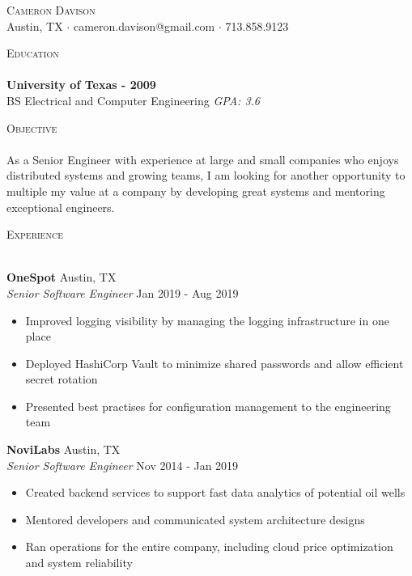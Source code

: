 \documentclass[a4paper]{article}
\newcommand{\lineunder} {
    \vspace*{-8pt} \\
    \hspace*{-18pt} \hrulefill \\
}
\newcommand{\header} [1] {
    {\hspace*{-18pt}\vspace*{6pt} \textsc{#1}}
    \vspace*{-6pt} \lineunder
}
\begin{document}
\vspace*{-40pt}

\vspace*{-10pt}
\begin{center}
	{\Huge \scshape {Cameron Davison}}\\
	Austin, TX $\cdot$ cameron.davison@gmail.com $\cdot$ 713.858.9123\\
\end{center}

\header{Education}
\textbf{University of Texas - 2009}\\
BS Electrical and Computer Engineering \textit{GPA: 3.6}\\
\vspace{2mm}

\header{Objective}
As a Senior Engineer with experience at large and small companies who enjoys distributed systems and growing teams, I
am looking for another opportunity to multiple my value at a company by developing great systems and mentoring
exceptional engineers.
\vspace{2mm}

\header{Experience}
\vspace{1mm}

\textbf{OneSpot} \hfill Austin, TX\\
\textit{Senior Software Engineer} \hfill Jan 2019 - Aug 2019\\
\vspace{-1mm}
\begin{itemize} \itemsep 1pt
\item Improved logging visibility by managing the logging infrastructure in one place
\item Deployed HashiCorp Vault to minimize shared passwords and allow efficient secret rotation
\item Presented best practises for configuration management to the engineering team
\end{itemize}

\textbf{NoviLabs} \hfill Austin, TX\\
\textit{Senior Software Engineer} \hfill Nov 2014 - Jan 2019\\
\vspace{-1mm}
\begin{itemize} \itemsep 1pt
\item Created backend services to support fast data analytics of potential oil wells
\item Mentored developers and communicated system architecture designs
\item Ran operations for the entire company, including cloud price optimization and system reliability
\end{itemize}
\end{document}
